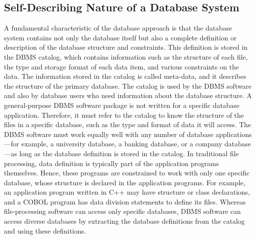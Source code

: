 \subsection{Self-Describing Nature of a Database System}
A fundamental characteristic of the database approach is that the database system contains not only the database itself but also a complete definition or description of the database structure and constraints. This definition is stored in the DBMS catalog, which contains information such as the structure of each file, the type and storage format of each data item, and various constraints on the data. The information stored in the catalog is called meta-data, and it describes the structure of the primary database. The catalog is used by the DBMS software and also by database users who need information about the database structure. A general-purpose DBMS software package is not written for a specific database application. Therefore, it must refer to the catalog to know the structure of the files in a specific database, such as the type and format of data it will access. The DBMS software must work equally well with any number of database applications—for example, a university database, a banking database, or a company database—as long as the database definition is stored in the catalog. In traditional file processing, data definition is typically part of the application programs themselves. Hence, these programs are constrained to work with only one specific database, whose structure is declared in the application programs. For example, an application program written in C++ may have structure or class declarations, and a COBOL program has data division statements to define its files. Whereas file-processing software can access only specific databases, DBMS software can access diverse databases by extracting the database definitions from the catalog and using these definitions.

